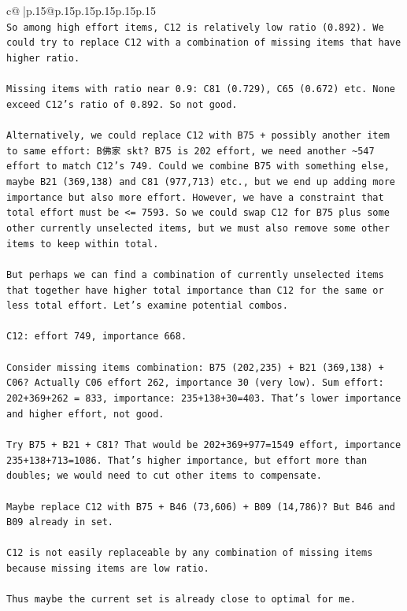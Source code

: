 \documentclass{article}
\begin{document}
{\begin{supertabular}{c@{$\;$}|p{.15\linewidth}@{}p{.15\linewidth}p{.15\linewidth}p{.15\linewidth}p{.15\linewidth}p{.15\linewidth}}
{{{\\ 
\texttt{So among high effort items, C12 is relatively low ratio (0.892). We could try to replace C12 with a combination of missing items that have higher ratio.} \\
\\ 
\texttt{Missing items with ratio near 0.9: C81 (0.729), C65 (0.672) etc. None exceed C12's ratio of 0.892. So not good.} \\
\\ 
\texttt{Alternatively, we could replace C12 with B75 + possibly another item to same effort: B佛家 skt? B75 is 202 effort, we need another \textasciitilde{}547 effort to match C12's 749. Could we combine B75 with something else, maybe B21 (369,138) and C81 (977,713) etc., but we end up adding more importance but also more effort. However, we have a constraint that total effort must be <= 7593. So we could swap C12 for B75 plus some other currently unselected items, but we must also remove some other items to keep within total.} \\
\\ 
\texttt{But perhaps we can find a combination of currently unselected items that together have higher total importance than C12 for the same or less total effort. Let's examine potential combos.} \\
\\ 
\texttt{C12: effort 749, importance 668.} \\
\\ 
\texttt{Consider missing items combination: B75 (202,235) + B21 (369,138) + C06? Actually C06 effort 262, importance 30 (very low). Sum effort: 202+369+262 = 833, importance: 235+138+30=403. That's lower importance and higher effort, not good.} \\
\\ 
\texttt{Try B75 + B21 + C81? That would be 202+369+977=1549 effort, importance 235+138+713=1086. That's higher importance, but effort more than doubles; we would need to cut other items to compensate.} \\
\\ 
\texttt{Maybe replace C12 with B75 + B46 (73,606) + B09 (14,786)? But B46 and B09 already in set.} \\
\\ 
\texttt{C12 is not easily replaceable by any combination of missing items because missing items are low ratio.} \\
\\ 
\texttt{Thus maybe the current set is already close to optimal for me.} \\
}}}
\end{supertabular}}
\end{document}
